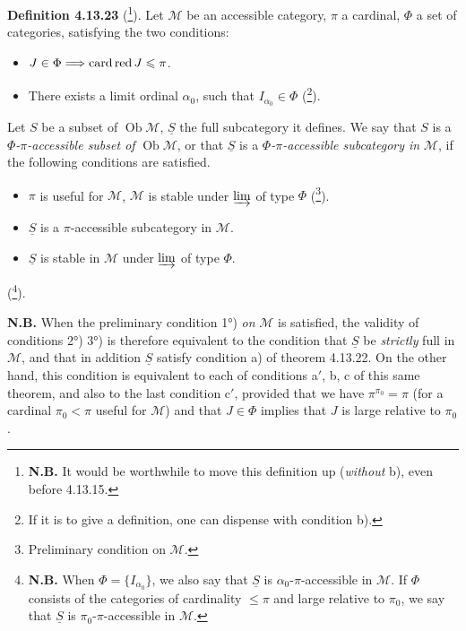 \documentclass[11pt]{article}
\newcommand{\printedpage}[1]{\marginpar{\footnotesize p.~#1}}
\newcommand{\msp}[1]{\marginpar{\footnotesize [#1]}}
\newcommand{\Ob}{\operatorname{Ob}}
\newcommand{\cardred}{\mathop{\textup{card\,red}}\nolimits}
\begin{document}
\textbf{Definition 4.13.23} (\footnote{\textbf{N.B.} It would be worthwhile to move this definition up (\textit{without} b), even before 4.13.15.}). Let $\mathcal{M}$ be an accessible category, $\pi$ a cardinal, $\Phi$ a set of categories, satisfying the two conditions:
\begin{itemize}[leftmargin=2.5em]
\item[a)] $J\in\Phi\Longrightarrow\cardred J\leqslant\pi$.
\item[b)] There exists a limit ordinal $\alpha_0$, such that $I_{\alpha_0}\in\Phi$ (\footnote{If it is to give a definition, one can dispense with condition b).}).
\end{itemize}
\msp{page 344}
Let $S$ be a subset of $\Ob\mathcal{M}$, $\underline{S}$ the full subcategory it defines. We say that $S$ is a \textit{$\Phi$-$\pi$-accessible subset of} $\Ob\mathcal{M}$, or that $\underline{S}$ is a \textit{$\Phi$-$\pi$-accessible subcategory in} $\mathcal{M}$, if the following conditions are satisfied.
\begin{itemize}[leftmargin=2.5em]
\item[1°)] $\pi$ is useful for $\mathcal{M}$, $\mathcal{M}$ is stable under $\varinjlim$ of type $\Phi$ (\footnote{Preliminary condition on $\mathcal{M}$.}).
\item[2°)] $\underline{S}$ is a $\pi$-accessible subcategory in $\mathcal{M}$.
\item[3°)] $\underline{S}$ is stable in $\mathcal{M}$ under $\varinjlim$ of type $\Phi$.
\end{itemize}
(\footnote{\textbf{N.B.} When $\Phi=\{I_{\alpha_0}\}$, we also say that $\underline{S}$ is $\alpha_0$-$\pi$-accessible in $\mathcal{M}$. If $\Phi$ consists of the categories of cardinality $\leqslant\pi$ and large relative to $\pi_0$, we say that $\underline{S}$ is $\pi_0$-$\pi$-accessible in $\mathcal{M}$.}).

\textbf{N.B.} When the preliminary condition 1°) \textit{on} $\mathcal{M}$ is satisfied, the validity of conditions 2°) 3°) is therefore equivalent to the condition that $\underline{S}$ be \textit{strictly} full in $\mathcal{M}$, and that in
\printedpage{131}
addition $\underline{S}$ satisfy condition a) of theorem 4.13.22. On the other hand, this condition is equivalent to each of conditions a$'$, b, c of this same theorem, and also to the last condition c$'$, provided that we have $\pi^{\pi_0}=\pi$ (for a cardinal $\pi_0<\pi$ useful for $\mathcal{M}$) and that $J\in\Phi$ implies that $J$ is large relative to $\pi_0$.
\end{document}
